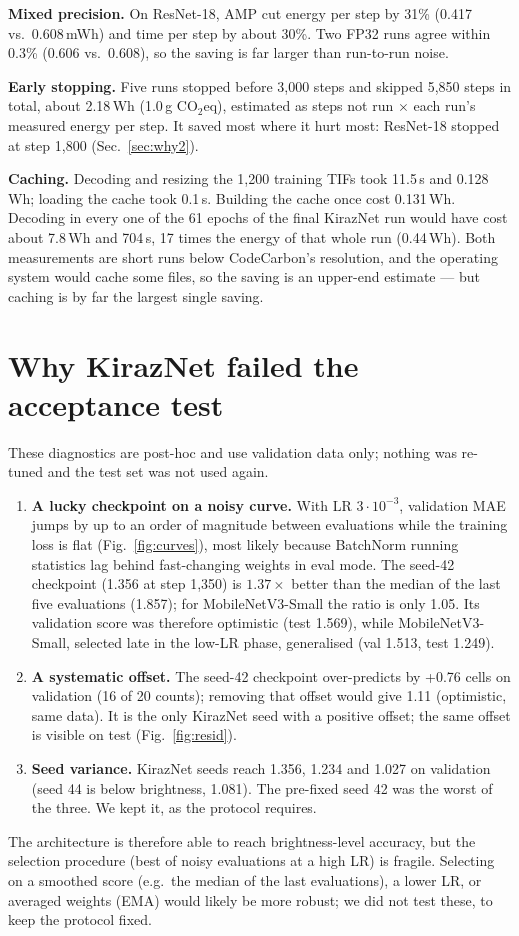 \documentclass[11pt,a4paper]{article}
\newcommand{\kn}{KirazNet}
\begin{document}
\textbf{Mixed precision.} On ResNet-18, AMP cut energy per step by 31\% (0.417 vs.\ 0.608\,mWh) and time
per step by about 30\%. Two FP32 runs agree within 0.3\% (0.606 vs.\ 0.608), so the saving is far larger
than run-to-run noise.

\textbf{Early stopping.} Five runs stopped before 3{,}000 steps and skipped 5{,}850 steps in total, about
2.18\,Wh (1.0\,g CO$_2$eq), estimated as steps not run $\times$ each run's measured energy per step. It
saved most where it hurt most: ResNet-18 stopped at step 1{,}800 (Sec.~\ref{sec:why2}).

\textbf{Caching.} Decoding and resizing the 1{,}200 training TIFs took 11.5\,s and 0.128\,Wh; loading the
cache took 0.1\,s. Building the cache once cost 0.131\,Wh. Decoding in every one of the 61 epochs of the
final \kn{} run would have cost about 7.8\,Wh and 704\,s, 17 times the energy of that whole run (0.44\,Wh).
Both measurements are short runs below CodeCarbon's resolution, and the operating system would cache
some files, so the saving is an upper-end estimate --- but caching is by far the largest single saving.

\section{Why \kn{} failed the acceptance test}\label{sec:why}
These diagnostics are post-hoc and use validation data only; nothing was re-tuned and the test set was
not used again.
\begin{enumerate}\setlength\itemsep{1pt}
\item \textbf{A lucky checkpoint on a noisy curve.} With LR $3\cdot10^{-3}$, validation MAE jumps by up to an
order of magnitude between evaluations while the training loss is flat (Fig.~\ref{fig:curves}), most
likely because BatchNorm running statistics lag behind fast-changing weights in eval mode. The seed-42
checkpoint (1.356 at step 1{,}350) is $1.37\times$ better than the median of the last five evaluations
(1.857); for MobileNetV3-Small the ratio is only 1.05. Its validation score was therefore optimistic
(test 1.569), while MobileNetV3-Small, selected late in the low-LR phase, generalised (val 1.513, test 1.249).
\item \textbf{A systematic offset.} The seed-42 checkpoint over-predicts by +0.76 cells on validation
(16 of 20 counts); removing that offset would give 1.11 (optimistic, same data). It is the only \kn{}
seed with a positive offset; the same offset is visible on test (Fig.~\ref{fig:resid}).
\item \textbf{Seed variance.} \kn{} seeds reach 1.356, 1.234 and 1.027 on validation (seed 44 is below
brightness, 1.081). The pre-fixed seed 42 was the worst of the three. We kept it, as the protocol requires.
\end{enumerate}
The architecture is therefore able to reach brightness-level accuracy, but the selection procedure
(best of noisy evaluations at a high LR) is fragile. Selecting on a smoothed score (e.g.\ the median of
the last evaluations), a lower LR, or averaged weights (EMA) would likely be more robust; we did not test
these, to keep the protocol fixed.
\end{document}
